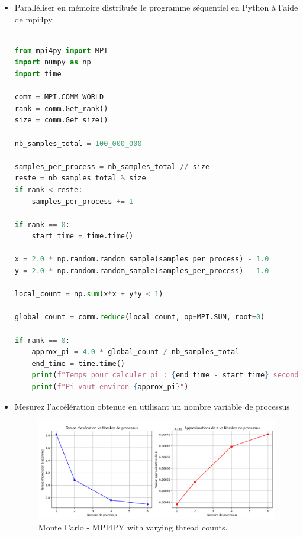 \documentclass[11pt,a4paper]{article}
\begin{document}
\begin{itemize}
\item Paralléliser en mémoire distribuée le programme séquentiel en Python à l'aide de mpi4py


\begin{lstlisting}[language=python, caption=Monte Carlo et MPI4PY reduction]

from mpi4py import MPI
import numpy as np
import time

comm = MPI.COMM_WORLD
rank = comm.Get_rank()
size = comm.Get_size()

nb_samples_total = 100_000_000

samples_per_process = nb_samples_total // size
reste = nb_samples_total % size
if rank < reste:
    samples_per_process += 1

if rank == 0:
    start_time = time.time()

x = 2.0 * np.random.random_sample(samples_per_process) - 1.0
y = 2.0 * np.random.random_sample(samples_per_process) - 1.0

local_count = np.sum(x*x + y*y < 1)

global_count = comm.reduce(local_count, op=MPI.SUM, root=0)

if rank == 0:
    approx_pi = 4.0 * global_count / nb_samples_total
    end_time = time.time()
    print(f"Temps pour calculer pi : {end_time - start_time} secondes")
    print(f"Pi vaut environ {approx_pi}")


\end{lstlisting}

\item Mesurez l'accélération obtenue en utilisant un nombre variable de processus

\begin{figure}[H]
	\centering
	\includegraphics[width=\dimexpr\textwidth]{sources/calcul_pi/PI_in_mpi4py.png}
	\caption{Monte Carlo - MPI4PY with varying thread counts.}
\end{figure}

\end{itemize}
\end{document}
